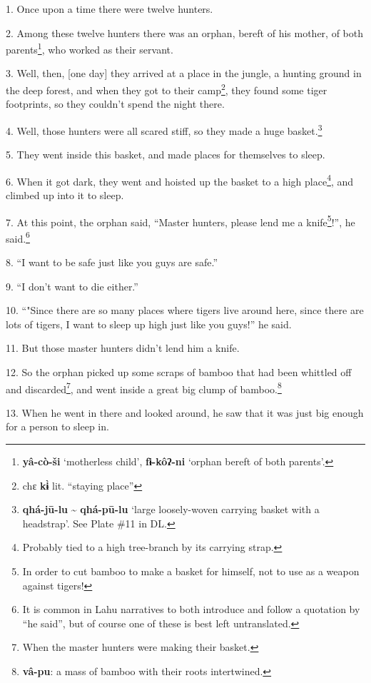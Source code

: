 \setcounter{footnote}{0}

1. Once upon a time there were twelve hunters.

2. Among these twelve hunters there was an orphan, bereft of his mother, of both
parents\footnote{\textbf{yâ-cò-ši} `motherless child', \textbf{fɨ-kôʔ-ni} `orphan bereft of both parents'.}, who worked as their servant.

3. Well, then, [one day] they arrived at a place in the jungle, a hunting ground
in the deep forest, and when they got to their camp\footnote{chɛ \textbf{kɨ̀} lit. ``staying place''}, they found some tiger
footprints, so they couldn't spend the night there.

4. Well, those hunters were all scared stiff, so they made a huge basket.\footnote{\textbf{qhá-jū-lu} \textasciitilde{} \textbf{qhá-pū-lu} `large loosely-woven carrying basket with a headstrap'. See Plate \#11 in DL.}

5. They went inside this basket, and made places for themselves to sleep.

6. When it got dark, they went and hoisted up the basket to a high place\footnote{Probably tied to a high tree-branch by its carrying strap.}, and
climbed up into it to sleep.

7. At this point, the orphan said, ``Master hunters, please lend me a knife\footnote{In order to cut bamboo to make a basket for himself, not to use as a weapon against tigers!}!'',
he said.\footnote{It is common in Lahu narratives to both introduce and follow a quotation by ``he said'', but of course one of these is best left untranslated.}

8. ``I want to be safe just like you guys are safe.''

9. ``I don't want to die either.''

10. ``"Since there are so many places where tigers live around here, since
there are lots of tigers, I want to sleep up high just like you guys!'' he said.

11. But those master hunters didn't lend him a knife.

12. So the orphan picked up some scraps of bamboo that had been whittled off and
discarded\footnote{When the master hunters were making their basket.}, and went inside a great big clump of bamboo.\footnote{\textbf{vâ-pu}: a mass of bamboo with their roots intertwined.}

13. When he went in there and looked around, he saw that it was just big enough
for a person to sleep in.

